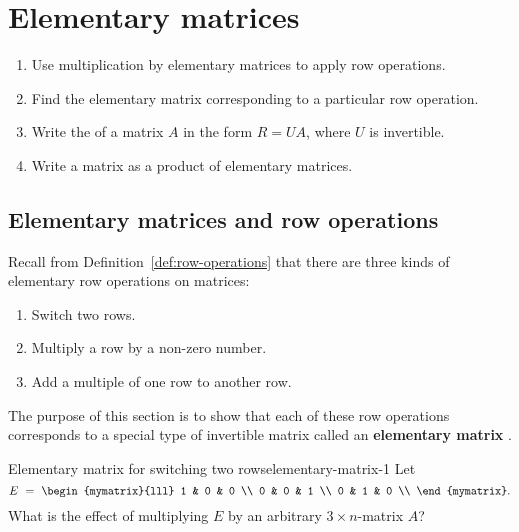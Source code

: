 \section{Elementary matrices}

\begin{outcome}
  \begin{enumerate}
  \item Use multiplication by elementary matrices to apply row
    operations.
  \item Find the elementary matrix corresponding to a particular row
    operation.
  \item Write the {\rref} of a matrix $A$ in the form $R=UA$, where
    $U$ is invertible.
  \item Write a matrix as a product of elementary matrices.
  \end{enumerate}
\end{outcome}

\subsection{Elementary matrices and row operations}

Recall from Definition~\ref{def:row-operations} that there are three
kinds of elementary row operations on matrices:
\begin{enumerate}
\item Switch two rows.
\item Multiply a row by a non-zero number.
\item Add a multiple of one row to another row.
\end{enumerate}
The purpose of this section is to show that each of these row
operations corresponds to a special type of invertible matrix called
an \textbf{elementary matrix}%
.

\begin{example}{Elementary matrix for switching two rows}{elementary-matrix-1}
  Let
  \begin{equation*}
    E ~=~ \begin{mymatrix}{lll}
      1 & 0 & 0 \\
      0 & 0 & 1 \\
      0 & 1 & 0 \\
    \end{mymatrix}.
  \end{equation*}
  What is the effect of multiplying $E$ by an arbitrary $3\times
  n$-matrix $A$?
\end{example}

